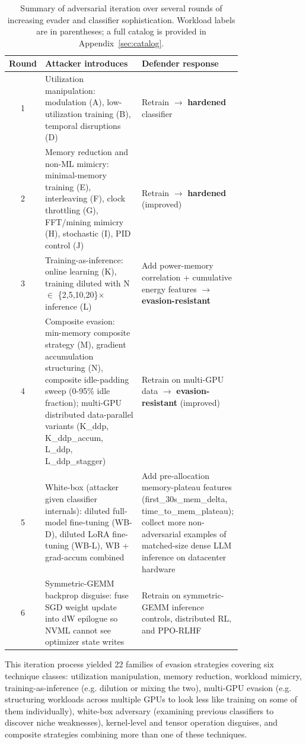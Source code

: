 \begin{table}[htbp]
\centering
\footnotesize
\begin{tabular}{cp{0.42\linewidth}p{0.36\linewidth}}
\toprule
\textbf{Round} & \textbf{Attacker introduces} & \textbf{Defender response} \\
\midrule
1 & Utilization manipulation: modulation (A), low-utilization training (B), temporal disruptions (D) & Retrain $\rightarrow$ \textbf{hardened} classifier \\
2 & Memory reduction and non-ML mimicry: minimal-memory training (E), interleaving (F), clock throttling (G), FFT/mining mimicry (H), stochastic (I), PID control (J) & Retrain $\rightarrow$ \textbf{hardened} (improved) \\
3 & Training-as-inference: online learning (K), training diluted with N $\in$ \{2,5,10,20\}$\times$ inference (L) & Add power-memory correlation + cumulative energy features $\rightarrow$ \textbf{evasion-resistant} \\
4 & Composite evasion: min-memory composite strategy (M), gradient accumulation structuring (N), composite idle-padding sweep (0-95\% idle fraction); multi-GPU distributed data-parallel variants (K\_ddp, K\_ddp\_accum, L\_ddp, L\_ddp\_stagger) & Retrain on multi-GPU data $\rightarrow$ \textbf{evasion-resistant} (improved) \\
5 & White-box (attacker given classifier internals): diluted full-model fine-tuning (WB-D), diluted LoRA fine-tuning (WB-L), WB + grad-accum combined & Add pre-allocation memory-plateau features (first\_30s\_mem\_delta, time\_to\_mem\_plateau); collect more non-adversarial examples of matched-size dense LLM inference on datacenter hardware \\
6 & Symmetric-GEMM backprop disguise: fuse SGD weight update into dW epilogue so NVML cannot see optimizer state writes & Retrain on symmetric-GEMM inference controls, distributed RL, and PPO-RLHF \\
\bottomrule
\end{tabular}
\caption{Summary of adversarial iteration over several rounds of increasing evader and classifier sophistication. Workload labels are in parentheses; a full catalog is provided in Appendix~\ref{sec:catalog}.}
\label{tab:rounds}
\end{table}

This iteration process yielded 22 families of evasion strategies covering six technique classes: utilization manipulation, memory reduction, workload mimicry, training-as-inference (e.g. dilution or mixing the two), multi-GPU evasion (e.g. structuring workloads across multiple GPUs to look less like training on some of them individually), white-box adversary (examining previous classifiers to discover niche weaknesses), kernel-level and tensor operation disguises, and composite strategies combining more than one of these techniques.


